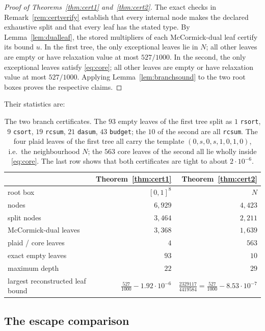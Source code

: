 \documentclass[11pt]{amsart}
\theoremstyle{definition}
\theoremstyle{remark}
\begin{document}
\begin{proof}[Proof of Theorems~\ref{thm:cert1} and~\ref{thm:cert2}]
The exact checks in Remark~\ref{rem:certverify} establish that every internal
node makes the declared exhaustive split and that every leaf has the stated
type.  By Lemma~\ref{lem:dualleaf}, the stored multipliers of each
McCormick-dual leaf certify its bound $u$.  In the first tree, the only exceptional leaves lie in \(N\); all other
leaves are empty or have relaxation value at most \(527/1000\).  In the
second, the only exceptional leaves satisfy \eqref{eq:core}; all other leaves
are empty or have relaxation value at most \(527/1000\).  Applying
Lemma~\ref{lem:branchsound} to the two root boxes proves the respective
claims.
\end{proof}

Their statistics are:
\begin{table}[ht]
\centering
\begin{tabular}{@{}lrr@{}}
\toprule
 & Theorem~\ref{thm:cert1} & Theorem~\ref{thm:cert2}\\
\midrule
root box & $[0,1]^8$ & $N$\\
nodes & $6{,}929$ & $4{,}423$\\
split nodes & $3{,}464$ & $2{,}211$\\
McCormick-dual leaves & $3{,}368$ & $1{,}639$\\
plaid / core leaves & $4$ & $563$\\
exact empty leaves & $93$ & $10$\\
maximum depth & $22$ & $29$\\
largest reconstructed leaf bound & $\tfrac{527}{1000}-1.92\cdot10^{-6}$ & $\tfrac{2329117}{4419584}=\tfrac{527}{1000}-8.53\cdot10^{-7}$\\
\bottomrule
\end{tabular}
\medskip
\caption{The two branch certificates. The $93$ empty leaves of the first tree split as $1$ \texttt{rsort}, $9$ \texttt{csort}, $19$ \texttt{rcsum}, $21$ \texttt{dasum}, $43$ \texttt{budget}; the $10$ of the second are all \texttt{rcsum}. The four plaid leaves of the first tree all carry the template $(0,s,0,s,1,0,1,0)$, i.e.\ the neighbourhood $N$; the $563$ core leaves of the second all lie wholly inside \eqref{eq:core}. The last row shows that both certificates are tight to about $2\cdot10^{-6}$.}\label{tab:certs}
\end{table}

\subsection{The escape comparison}
\end{document}
